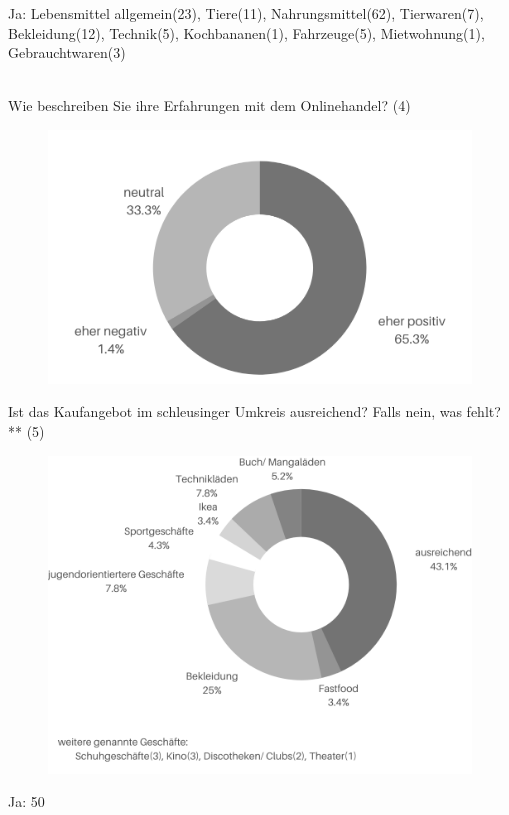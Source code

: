 Ja: Lebensmittel allgemein(23), Tiere(11), Nahrungsmittel(62), Tierwaren(7), Bekleidung(12), Technik(5), Kochbananen(1), Fahrzeuge(5), Mietwohnung(1), Gebrauchtwaren(3)\\\\
\fi

\newpage\noindent Wie beschreiben Sie ihre Erfahrungen mit dem Onlinehandel? (4)
\begin{figure}[H]
    \begin{center}
        \includegraphics[width=11.5cm]{media/schuelerumfrage/4.png}
    \end{center}
\end{figure}

\noindent Ist das Kaufangebot im schleusinger Umkreis ausreichend? Falls nein, was fehlt?** (5)\\

\begin{figure}[H]
    \begin{center}
        \includegraphics[width=15cm]{media/schuelerumfrage/5.png}
    \end{center}
\end{figure}
\iffalse
Ja: 50

